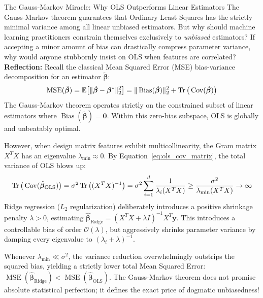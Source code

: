 \begin{ponderbox}{The Gauss-Markov Miracle: Why OLS Outperforms Linear Estimators}
The Gauss-Markov theorem guarantees that Ordinary Least Squares has the strictly minimal variance among all linear unbiased estimators. But why should machine learning practitioners constrain themselves exclusively to \emph{unbiased} estimators? If accepting a minor amount of bias can drastically compress parameter variance, why would anyone stubbornly insist on OLS when features are correlated?
\tcblower
\textbf{Reflection:}
Recall the classical Mean Squared Error (MSE) bias-variance decomposition for an estimator $\tilde{\boldsymbol{\beta}}$:
\begin{equation*}
\operatorname{MSE}(\tilde{\boldsymbol{\beta}}) = \mathbb{E}\big[\|\tilde{\boldsymbol{\beta}} - \boldsymbol{\beta}^*\|_2^2\big] = \|\operatorname{Bias}(\tilde{\boldsymbol{\beta}})\|_2^2 + \operatorname{Tr}\big(\operatorname{Cov}(\tilde{\boldsymbol{\beta}})\big)
\end{equation*}
The Gauss-Markov theorem operates strictly on the constrained subset of linear estimators where $\operatorname{Bias}(\tilde{\boldsymbol{\beta}}) = \mathbf{0}$. Within this zero-bias subspace, OLS is globally and unbeatably optimal.

However, when design matrix features exhibit multicollinearity, the Gram matrix $X^T X$ has an eigenvalue $\lambda_{\min} \approx 0$. By Equation~\eqref{eq:ols_cov_matrix}, the total variance of OLS blows up:
\begin{equation*}
\operatorname{Tr}\big(\operatorname{Cov}(\hat{\boldsymbol{\beta}}_{\mathrm{OLS}})\big) = \sigma^2 \operatorname{Tr}\big((X^T X)^{-1}\big) = \sigma^2 \sum_{i=1}^d \frac{1}{\lambda_i(X^T X)} \ge \frac{\sigma^2}{\lambda_{\min}(X^T X)} \to \infty
\end{equation*}
Ridge regression ($L_2$ regularization) deliberately introduces a positive shrinkage penalty $\lambda > 0$, estimating $\hat{\boldsymbol{\beta}}_{\mathrm{Ridge}} = (X^T X + \lambda I)^{-1} X^T \mathbf{y}$. This introduces a controllable bias of order $\mathcal{O}(\lambda)$, but aggressively shrinks parameter variance by damping every eigenvalue to $(\lambda_i + \lambda)^{-1}$.

Whenever $\lambda_{\min} \ll \sigma^2$, the variance reduction overwhelmingly outstrips the squared bias, yielding a strictly lower total Mean Squared Error: $\operatorname{MSE}(\hat{\boldsymbol{\beta}}_{\mathrm{Ridge}}) < \operatorname{MSE}(\hat{\boldsymbol{\beta}}_{\mathrm{OLS}})$. The Gauss-Markov theorem does not promise absolute statistical perfection; it defines the exact price of dogmatic unbiasedness!
\end{ponderbox}

